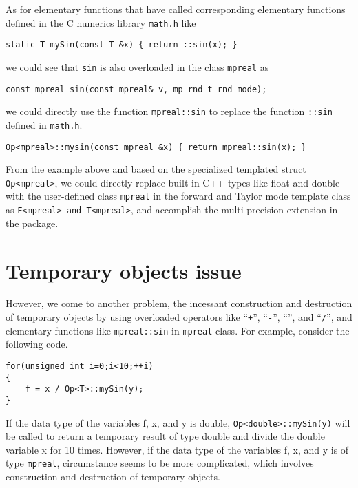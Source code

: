 As for elementary functions that have called corresponding elementary functions defined in the C numerics library {\tt math.h} like
\begin{lstlisting}[numbers=none]
static T mySin(const T &x) { return ::sin(x); }
\end{lstlisting}
we could see that \texttt{sin} is also overloaded in the class \texttt{mpreal} as
\begin{lstlisting}[numbers=none]
const mpreal sin(const mpreal& v, mp_rnd_t rnd_mode);
\end{lstlisting}
we could directly use the function \texttt{mpreal::sin} to replace the function {\tt::sin} defined in \texttt{math.h}.
\begin{lstlisting}[numbers=none]
Op<mpreal>::mysin(const mpreal &x) { return mpreal::sin(x); }
\end{lstlisting}
From the example above and based on the specialized templated struct {\tt Op<mpreal>}, we could directly replace built-in C++ types like float and double with the user-defined class {\tt mpreal} in the forward and Taylor mode template class as {\tt F<mpreal> and T<mpreal>}, and accomplish the multi-precision extension in the \FADBADpp package.
\section{Temporary objects issue}
However, we come to another problem, the incessant construction and destruction of temporary objects by using overloaded operators like ``{\tt +}'', ``{\tt -}'', ``{\tt *}'', and ``{\tt /}'', and elementary functions like {\tt mpreal::sin} in \texttt{mpreal} class. For example, consider the following code.
\begin{lstlisting}[numbers=none]
for(unsigned int i=0;i<10;++i)
{
	f = x / Op<T>::mySin(y);
}
\end{lstlisting}	
If the data type of the variables f, x, and y is double, \texttt{Op<double>::mySin(y)} will be called to return a temporary result of type double and divide the double variable x for 10 times. However, if the data type of the variables f, x, and y is of type \texttt{mpreal}, circumstance seems to be more complicated, which involves construction and destruction of temporary objects.

